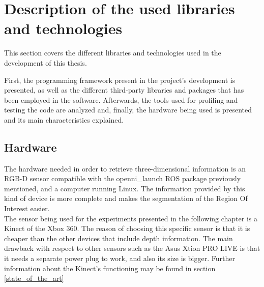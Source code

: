 \section{Description of the used libraries and technologies}
\label{libraries_and_technologies}

This section covers the different libraries and technologies used in the development of this thesis.

 First, the programming framework present in the project's development is presented, as well as the different third-party libraries and packages that has been employed in the software. Afterwards, the tools used for profiling and testing the code are analyzed and, finally, the hardware being used is presented and its main characteristics explained. 




	\subsection{Hardware}
		\label{technologies_hardware}

		The hardware needed in order to retrieve three-dimensional information is an RGB-D sensor compatible with the openni\_launch ROS package previously mentioned, and a computer running Linux. The information provided by this kind of device is more complete and makes the segmentation of the Region Of Interest easier. \\

		The sensor being used for the experiments presented in the following chapter is a Kinect of the Xbox 360. The reason of choosing this specific sensor is that it is cheaper than the other devices that include depth information. The main drawback with respect to other sensors such as the Asus Xtion PRO LIVE\cite{xtion} is that it needs a separate power plug to work, and also its size is bigger. 
		Further information about the Kinect's functioning may be found in section \ref{state_of_the_art}




